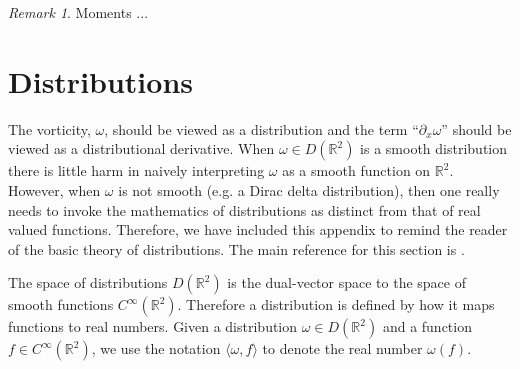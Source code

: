 \documentclass[12pt]{amsart}
\newcommand{\R}{\ensuremath{\mathbb{R}}}
\theoremstyle{remark}
\newtheorem{rmk}[thm]{Remark}
\begin{document}
\begin{rmk}
  Moments ... 
\end{rmk}


\appendix

\section{Distributions}
\label{sec:distributions}
The vorticity, $\omega$, should be viewed as a distribution
and the term ``$\partial_x \omega$'' should be viewed
as a distributional derivative.
When $\omega \in D(\R^2)$ is a smooth distribution there is little harm in naively interpreting $\omega$ as a smooth function on $\R^2$.
However, when $\omega$ is not smooth (e.g. a Dirac delta distribution),
then one really needs to invoke the mathematics of distributions
as distinct from that of real valued functions.
Therefore, we have included this appendix to remind the reader of the basic theory of distributions.
The main reference for this section is \cite{Hormander2003}.

The space of distributions $D(\R^2)$ is the dual-vector space to the space of smooth functions $C^\infty(\R^2)$.
Therefore a distribution is defined by how it maps functions to real numbers.
Given a distribution $\omega \in D(\R^2)$ and a function $f \in C^\infty(\R^2)$,
we use the notation $\langle \omega , f \rangle$ to denote the real number $\omega(f)$.
\end{document}
